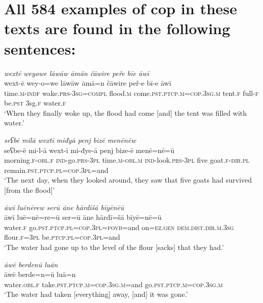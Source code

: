 \chapter{All 584 examples of cop in these texts are found in the following sentences:}

\ea \label{ZB.20}
\textit{wextē weyowe lāwāw āmān čāwire peře bīe āwī} \\ 
\gll wext-ē wey-o=we lāwāw āmā=n čāwire peř-e bī-e āwī \\ 
 time\textsc{.m}\textsc{-indf} wake\textsc{.prs}\textsc{-3sg}\textsc{=compl} flood\textsc{.m} come\textsc{.pst}\textsc{.ptcp}\textsc{.m}\textsc{=cop}\textsc{.3sg}\textsc{.m} tent\textsc{.f} full\textsc{-f} be\textsc{.pst} 3sg\textsc{.f} water\textsc{.f} \\ 
\glt `When they finally woke up, the flood had come [and] the tent was filled with water.'
\z 
 
\ea \label{ZB.27}
\textit{seʕbē milā wextī miđyā penj bizē menēnēw} \\ 
\gll seʕbe-ē mi-l-ā wext-ī mi-đye-ā penj bize-ē menē=nē=ū \\ 
 morning\textsc{.f}\textsc{-obl}\textsc{.f} \textsc{ind-}go\textsc{.prs}\textsc{-3pl} time\textsc{.m}\textsc{-obl}\textsc{.m} \textsc{ind-}look\textsc{.prs}\textsc{-3pl} five goat\textsc{.f}\textsc{-dir}\textsc{.pl} remain\textsc{.pst}\textsc{.ptcp}\textsc{.pl}\textsc{=cop}\textsc{.3pl}=and \\ 
\glt `The next day, when they looked around, they saw that five goats had survived [from the flood]'
\z 
 
\ea \label{ZB.28}
\textit{āwī luēnērew serū āne hārdīšā bīyēnēū} \\ 
\gll āwī luē=nē=re=ū ser=ū āne hārdī=šā bīyē=nē=ū \\ 
 water\textsc{.f} go\textsc{.pst}\textsc{.ptcp}\textsc{.pl}\textsc{=cop}\textsc{.3pl}\textsc{=\textsc{povb}}=and on\textsc{\textsc{=ez.gen}} \textsc{dem.dist}\textsc{.dir}\textsc{.m}\textsc{.3sg} flour\textsc{.f}\textsc{=3pl} be\textsc{.ptcp}\textsc{.pl}\textsc{=cop}\textsc{.3pl}=and \\ 
\glt `The water had gone up to the level of the flour [sacks] that they had.'
\z 
 
\ea \label{ZB.30}
\textit{āwē berdenū luān} \\ 
\gll āwē berde=n=ū luā=n \\ 
 water\textsc{.obl}\textsc{.f} take\textsc{.pst}\textsc{.ptcp}\textsc{.m}\textsc{=cop}\textsc{.3sg}\textsc{.m}=and go\textsc{.pst}\textsc{.ptcp}\textsc{.m}\textsc{=cop}\textsc{.3sg}\textsc{.m} \\ 
\glt `The water had taken [everything] away, [and] it was gone.'
\z 
 
